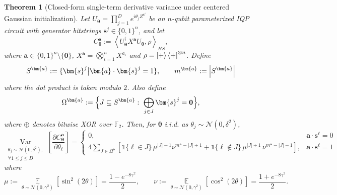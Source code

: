 \documentclass[a4paper,onecolumn,notitlepage,nofootinbib,longbibliography,superscriptaddress, floatfix, pra, aps, 10pt]{revtex4-2}
\newcommand{\inner}[2]{\left\langle #1, #2 \right\rangle}
\newcommand{\vttheta}{{\bm{\theta}}}
\newcommand{\vta}{{\bm{a}}}
\newcommand{\vtsj}{{\bm{s}^j}}
\newcommand{\vtsl}{{\bm{s}^\ell}}
\newtheorem{theorem}{Theorem}
\begin{document}
\begin{theorem}[Closed-form single-term derivative variance under centered Gaussian initialization]
\label{thm: single Gaussian}
Let $U_\vttheta = \prod_{j=1}^D e^{i \theta_j Z^\vtsj}$ be an $n$-qubit parameterized IQP circuit with generator
bitstrings $\vtsj \in \{0,1\}^n$, and let
\begin{equation}
    C^\vta_\vttheta := 
    \inner{U_\vttheta^\dagger X^{\vta}U_\vttheta}{\rho }_{HS}, 
\end{equation}
where $\vta \in \{0,1\}^n \setminus \{\mathbf{0}\}$, $X^\vta = \bigotimes_{\iota=1}^n X^{a_\iota}$ and $\rho = \ket{+}\bra{+}^{\otimes n}$. Define
\begin{equation}
S^{\vta} := \{ \vtsj \big| \vta \cdot \vtsj = 1 \},
\qquad
m^\vta := \abs{S^{\vta}}
\end{equation}
where the dot product is taken modulo $2$. Also define \begin{equation}
    \Omega^\vta:=\Bigl\{J\subseteq S^\vta:\ \bigoplus_{j\in J}\vtsj=\mathbf 0\Bigr\},
\end{equation}
where $\oplus$ denotes bitwise XOR over $\mathbb F_2$.
Then, for $\vttheta$ i.i.d. as $\theta_j \sim \mathcal{N}(0, \delta^2)$,
\begin{equation}
\operatorname*{Var}_{\substack{\theta_j \sim \mathcal{N}(0, \delta^2),\\ \forall 1 \leq j \leq D}} \left[ \frac{\partial C^\vta_\vttheta}{\partial \theta_\ell} \right]
= \begin{cases}
0, & \vta \cdot \vtsl=0 \\
4\sum_{J\in \Omega^\vta}
\left[
\mathds{1}\{\ell\in J\}\,\mu^{|J|-1}\nu^{m^\vta-|J|+1}
+
\mathds{1}\{\ell\notin J\}\,\mu^{|J|+1}\,\nu^{m^\vta-|J|-1}
\right], & \vta \cdot \vtsl=1
\end{cases}
\end{equation}
where
\begin{equation}
    \mu:=\operatorname*{\mathbb{E}}_{\theta\sim\mathcal N(0,\gamma^2)}[\sin^2(2\theta)]
=\frac{1-e^{-8\gamma^2}}{2},
\qquad
\nu:=\operatorname*{\mathbb{E}}_{\theta\sim\mathcal N(0,\gamma^2)}[\cos^2(2\theta)]
=\frac{1+e^{-8\gamma^2}}{2}.
\end{equation}
\end{theorem}
\end{document}
